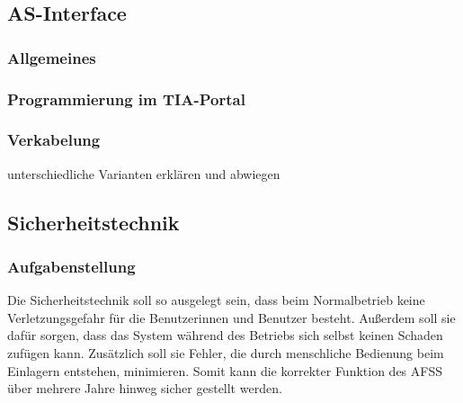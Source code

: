\subsection{AS-Interface}

\subsubsection{Allgemeines}

\subsubsection{Programmierung im TIA-Portal}

\subsubsection{Verkabelung}
unterschiedliche Varianten erklären und abwiegen

\subsection{Sicherheitstechnik}
\subsubsection{Aufgabenstellung}
Die Sicherheitstechnik soll so ausgelegt sein, dass beim Normalbetrieb keine Verletzungsgefahr für die Benutzerinnen und Benutzer besteht. Außerdem soll sie dafür sorgen, dass das System während des Betriebs sich selbst keinen Schaden zufügen kann. Zusätzlich soll sie Fehler, die durch menschliche Bedienung beim Einlagern entstehen, minimieren. Somit kann die korrekter Funktion des AFSS über mehrere Jahre hinweg sicher gestellt werden.


